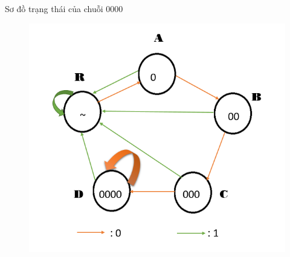 \documentclass[a4paper]{article}
\begin{document}
	
	Sơ đồ trạng thái của chuỗi 0000
	\begin{center}
	\begin{figure}[h]
		\begin{center}
			\includegraphics[scale=0.53]{0000.png}
		\end{center}
	\end{figure}
	\end{center}
	
\end{document}
